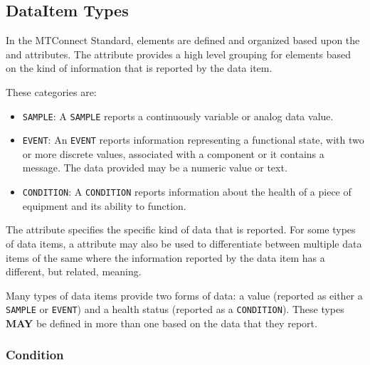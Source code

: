 \subsection{DataItem Types} \label{sec:DataItem Types}


In the MTConnect Standard,  elements are defined and organized based upon the  and  attributes.  The  attribute provides a high level grouping for  elements based on the kind of information that is reported by the data item.

These categories are:


\begin{itemize}
    \item \texttt{SAMPLE}: A \texttt{SAMPLE} reports a continuously variable or analog data value. 

    \item \texttt{EVENT}: An \texttt{EVENT} reports information representing a functional state, with two or more discrete values, associated with a component or it contains a message.  The data provided may be a numeric value or text.

    \item \texttt{CONDITION}: A \texttt{CONDITION} reports information about the health of a piece of equipment and its ability to function.

\end{itemize}

The  attribute specifies the specific kind of data that is reported.   For some types of data items, a  attribute may also be used to differentiate between multiple data items of the same  where the information reported by the data item has a different, but related, meaning.

Many types of data items provide two forms of data: a value (reported as either a \texttt{SAMPLE} or \texttt{EVENT}) and a health status (reported as a \texttt{CONDITION}).  These  types \textbf{MAY} be defined in more than one  based on the data that they report.



\subsubsection{Condition}
\label{sec:Condition}



